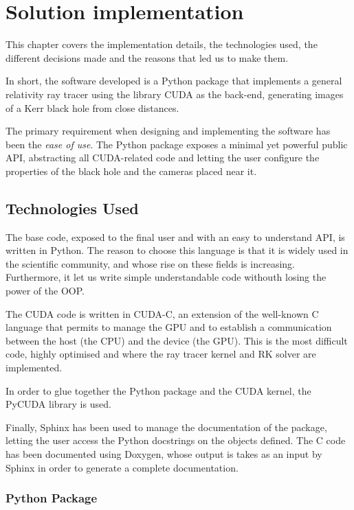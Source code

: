 \chapter{Solution implementation}
\label{chapter:implementation}

This chapter covers the implementation details, the technologies used, the different decisions made and the reasons that led us to make them.

In short, the software developed is a Python package that implements a general relativity ray tracer using the library \ac{CUDA} as the back-end, generating images of a Kerr black hole from close distances.

The primary requirement when designing and implementing the software has been the \emph{ease of use}. The Python package exposes a minimal yet powerful public \ac{API}, abstracting all \ac{CUDA}-related code and letting the user configure the properties of the black hole and the cameras placed near it.

\section{Technologies Used}

The base code, exposed to the final user and with an easy to understand \ac{API}, is written in Python. The reason to choose this language is that it is widely used in the scientific community, and whose rise on these fields is increasing. Furthermore, it let us write simple understandable code withouth losing the power of the \ac{OOP}.

The \ac{CUDA} code is written in \ac{CUDA}-C, an extension of the well-known C language that permits to manage the \ac{GPU} and to establish a communication between the host (the \ac{CPU}) and the device (the \ac{GPU}). This is the most difficult code, highly optimised and where the ray tracer kernel and \ac{RK} solver are implemented.

In order to glue together the Python package and the \ac{CUDA} kernel, the PyCUDA library is used.

Finally, Sphinx has been used to manage the documentation of the package, letting the user access the Python docstrings on the objects defined. The C code has been documented using Doxygen, whose output is takes as an input by Sphinx in order to generate a complete documentation.

\subsection{Python Package}

